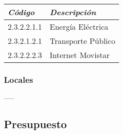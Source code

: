         \begin{table}[h!]
            \centering
            \begin{tabular}{|p{3cm}|p{5cm}|} \hline
                 
            
            \textit{{\bf{Código}}} &
            \textit{{\bf{Descripción}}}
            \\ \hline

            2.3.2.2.1.1 &
            Energía Eléctrica
            \\ \hline

            2.3.2.1.2.1 &
            Transporte Público
            \\ \hline

            2.3.2.2.2.3 &
            Internet Movistar
            \\ \hline

            \end{tabular}
        \end{table}


    \subsubsection{Locales}

    -----

\subsection{Presupuesto}
